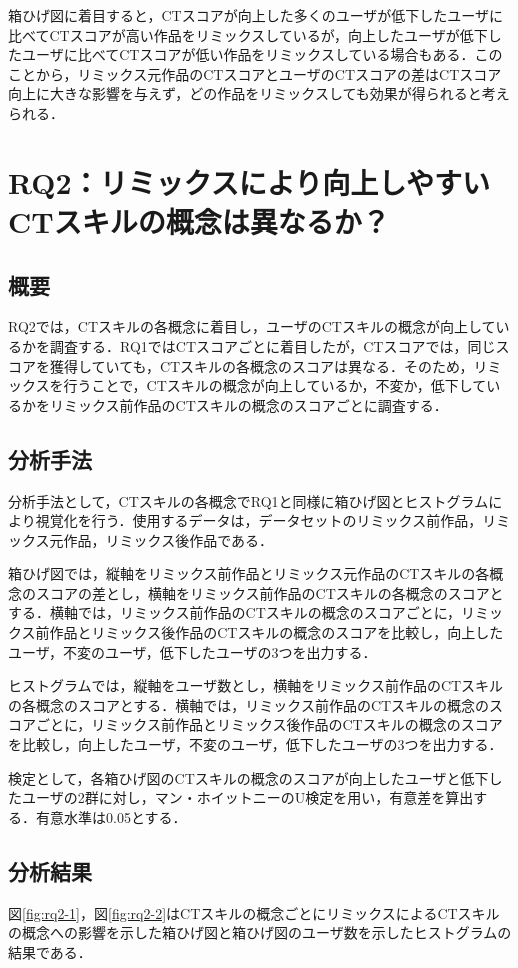 \documentclass[11pt]{jreport}
\begin{document}
箱ひげ図に着目すると，CTスコアが向上した多くのユーザが低下したユーザに比べてCTスコアが高い作品をリミックスしているが，向上したユーザが低下したユーザに比べてCTスコアが低い作品をリミックスしている場合もある．このことから，リミックス元作品のCTスコアとユーザのCTスコアの差はCTスコア向上に大きな影響を与えず，どの作品をリミックスしても効果が得られると考えられる．

\chapter{RQ2：リミックスにより向上しやすいCTスキルの概念は異なるか？}
\section{概要}
RQ2では，CTスキルの各概念に着目し，ユーザのCTスキルの概念が向上しているかを調査する．RQ1ではCTスコアごとに着目したが，CTスコアでは，同じスコアを獲得していても，CTスキルの各概念のスコアは異なる．そのため，リミックスを行うことで，CTスキルの概念が向上しているか，不変か，低下しているかをリミックス前作品のCTスキルの概念のスコアごとに調査する．

\section{分析手法}
分析手法として，CTスキルの各概念でRQ1と同様に箱ひげ図とヒストグラムにより視覚化を行う．使用するデータは，データセットのリミックス前作品，リミックス元作品，リミックス後作品である．

箱ひげ図では，縦軸をリミックス前作品とリミックス元作品のCTスキルの各概念のスコアの差とし，横軸をリミックス前作品のCTスキルの各概念のスコアとする．横軸では，リミックス前作品のCTスキルの概念のスコアごとに，リミックス前作品とリミックス後作品のCTスキルの概念のスコアを比較し，向上したユーザ，不変のユーザ，低下したユーザの3つを出力する．

ヒストグラムでは，縦軸をユーザ数とし，横軸をリミックス前作品のCTスキルの各概念のスコアとする．横軸では，リミックス前作品のCTスキルの概念のスコアごとに，リミックス前作品とリミックス後作品のCTスキルの概念のスコアを比較し，向上したユーザ，不変のユーザ，低下したユーザの3つを出力する．

検定として，各箱ひげ図のCTスキルの概念のスコアが向上したユーザと低下したユーザの2群に対し，マン・ホイットニーのU検定を用い，有意差を算出する．有意水準は0.05とする．

\section{分析結果}
図\ref{fig:rq2-1}，図\ref{fig:rq2-2}はCTスキルの概念ごとにリミックスによるCTスキルの概念への影響を示した箱ひげ図と箱ひげ図のユーザ数を示したヒストグラムの結果である．
\end{document}
